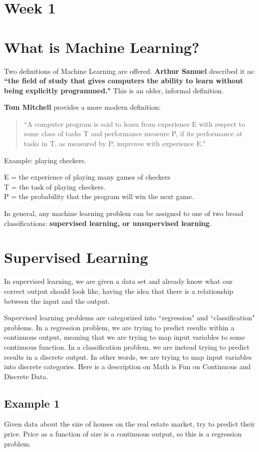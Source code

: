\section{Week 1}
\section*{What is Machine Learning?}
Two definitions of Machine Learning are offered. {\bf Arthur Samuel} described it as: {\bf ``the field of study that gives computers the ability to learn without being explicitly programmed."} This is an older, informal definition.

{\bf Tom Mitchell} provides a more modern definition: 
\begin{quote}
``A computer program is said to learn from experience E with respect to some class of tasks T and performance measure P, if its performance at tasks in T, as measured by P, improves with experience E."
\end{quote}
Example: playing checkers.

E = the experience of playing many games of checkers \\[1pt]
T = the task of playing checkers.\\[1pt]
P = the probability that the program will win the next game.

In general, any machine learning problem can be assigned to one of two broad classifications: {\bf supervised learning, or unsupervised learning}.

\section*{Supervised Learning}
In supervised learning, we are given a data set and already know what our correct output should look like, having the idea that there is a relationship between the input and the output.

Supervised learning problems are categorized into ``regression" and ``classification" problems. In a regression problem, we are trying to predict results within a continuous output, meaning that we are trying to map input variables to some continuous function. In a classification problem, we are instead trying to predict results in a discrete output. In other words, we are trying to map input variables into discrete categories. Here is a description on Math is Fun on Continuous and Discrete Data.
\subsection*{Example 1}
Given data about the size of houses on the real estate market, try to predict their price. Price as a function of size is a continuous output, so this is a regression problem.


